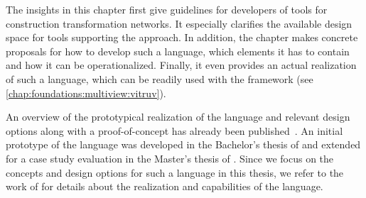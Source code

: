 
The insights in this chapter first give guidelines for developers of tools for construction transformation networks.
It especially clarifies the available design space for tools supporting the \commonalities approach.
In addition, the chapter makes concrete proposals for how to develop such a language, which elements it has to contain and how it can be operationalized.
Finally, it even provides an actual realization of such a language, which can be readily used with the \vitruv framework (see \autoref{chap:foundations:multiview:vitruv}).

An overview of the prototypical realization of the \commonalities language and relevant design options along with a proof-of-concept has already been published~.
An initial prototype of the language was developed in the Bachelor's thesis of  and extended for a case study evaluation in the Master's thesis of .
Since we focus on the concepts and design options for such a language in this thesis, we refer to the work of  for details about the realization and capabilities of the \commonalities language.





